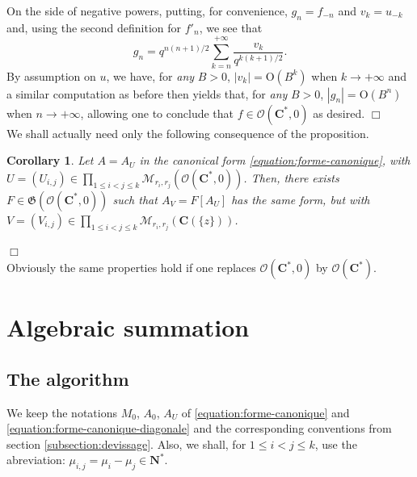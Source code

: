 \documentclass[english]{smfart}
\newtheorem{cor}[thm]{Corollary}
\numberwithin{equation}{thm}
\def\C{{\mathbf C}}
\def\N{{\mathbf N}}
\def\M{{\mathcal{M}}}
\def\G{{\mathfrak{G}}}
\def\Ka{{\C(\{z\})}}
\def\Rw{{\mathcal{O}(\C^{*})}}
\def\Rwg{{\mathcal{O}(\C^{*},0)}}
\begin{document}
On the side of negative powers, putting, for convenience,
$g_{n} = f_{-n}$ and $v_{k} = u_{-k}$ and, using the second definition
for $f'_{n}$, we see that 
$$
g_{n} = q^{n(n+1)/2} \sum_{k = n}^{+ \infty} \frac{v_{k}}{q^{k(k+1)/2}}.
$$
By assumption on $u$, we have, for \emph{any} $B > 0$, 
$\left|v_{k}\right| = \text{O}(B^{k})$ when $k \to + \infty$ and
a similar computation as before then yields that, for \emph{any} $B > 0$, 
$\left|g_{n}\right| = \text{O}(B^{n})$ when $n \to + \infty$,
allowing one to conclude that $f \in \Rwg$ as desired.
\hfill $\Box$ \\

We shall actually need only the following consequence of the proposition.

\begin{cor} \label{cor:Rwg=Ka}
Let $A = A_{U}$ in the canonical form \ref{equation:forme-canonique},
with 
$U = (U_{i,j}) \in 
\underset{1 \leq i < j \leq k}{\prod} \M_{r_{i},r_{j}}(\Rwg)$.
Then, there exists $F \in \G(\Rwg)$ such that $A_{V} = F[A_{U}]$
has the same form, but with 
$V = (V_{i,j}) \in 
\underset{1 \leq i < j \leq k}{\prod} \M_{r_{i},r_{j}}(\Ka)$.
\end{cor}
\hfill $\Box$ \\

Obviously the same properties hold if one replaces $\Rwg$ by $\Rw$.



\section{Algebraic summation}



\subsection{The algorithm}

We keep the notations $M_{0}$, $A_{0}$, $A_{U}$ of 
\ref{equation:forme-canonique} and 
\ref{equation:forme-canonique-diagonale}
and the corresponding conventions from section \ref{subsection:devissage}.
Also, we shall, for $1 \leq i < j \leq k$, use the abreviation:
$\mu_{i,j} = \mu_{i} - \mu_{j} \in \N^{*}$.
\end{document}
